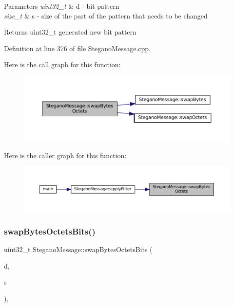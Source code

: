 \begin{DoxyParams}{Parameters}
{\em uint32\+\_\+t} & d -\/ bit pattern \\
\hline
{\em size\+\_\+t} & s -\/ size of the part of the pattern that needs to be changed \\
\hline
\end{DoxyParams}
\begin{DoxyReturn}{Returns}
uint32\+\_\+t generated new bit pattern 
\end{DoxyReturn}


Definition at line 376 of file Stegano\+Message.\+cpp.

Here is the call graph for this function\+:
\nopagebreak
\begin{figure}[H]
\begin{center}
\leavevmode
\includegraphics[width=350pt]{classSteganoMessage_ad21d0b7dd149e81d9a199fb26a799da4_cgraph}
\end{center}
\end{figure}
Here is the caller graph for this function\+:
\nopagebreak
\begin{figure}[H]
\begin{center}
\leavevmode
\includegraphics[width=350pt]{classSteganoMessage_ad21d0b7dd149e81d9a199fb26a799da4_icgraph}
\end{center}
\end{figure}
\mbox{\label{classSteganoMessage_ab17fa1a4dc587ae268e400913cc5f0c8}} 
\subsubsection{\texorpdfstring{swapBytesOctetsBits()}{swapBytesOctetsBits()}}
{\footnotesize\ttfamily uint32\+\_\+t Stegano\+Message\+::swap\+Bytes\+Octets\+Bits (\begin{DoxyParamCaption}\item[{uint32\+\_\+t}]{d,  }\item[{size\+\_\+t}]{s }\end{DoxyParamCaption})\hspace{0.3cm}{\ttfamily [static]}, {\ttfamily [private]}}



